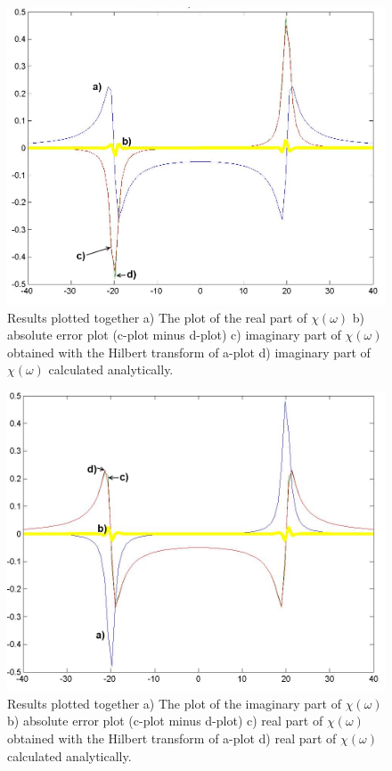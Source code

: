 \documentclass[12pt,twoside,a4paper]{article}
\numberwithin{equation}{subsection}
\numberwithin{figure}{subsection}
\begin{document}
\begin{figure} 
  \includegraphics[width=150mm]{img/hcc_lin1.png}
  \caption{Results plotted together 
   a) The plot of the real part of $\chi (\omega )$ 
   b) absolute error plot (c-plot minus d-plot) 
   c) imaginary part of $\chi (\omega )$ obtained with the Hilbert transform of a-plot 
   d) imaginary part of $\chi (\omega )$  calculated analytically. \label{fig:cci_lin1}
  }
\end{figure}

\begin{figure} 
  \includegraphics[width=150mm]{img/hcc_lin2.png}
  \caption{Results plotted together 
   a) The plot of the imaginary part of $\chi (\omega )$ 
   b) absolute error plot (c-plot minus d-plot) 
   c) real part of $\chi (\omega )$ obtained with the Hilbert transform of a-plot 
   d) real part of $\chi (\omega )$ calculated analytically. \label{fig:cci_lin2}
  }
\end{figure}
\end{document}
